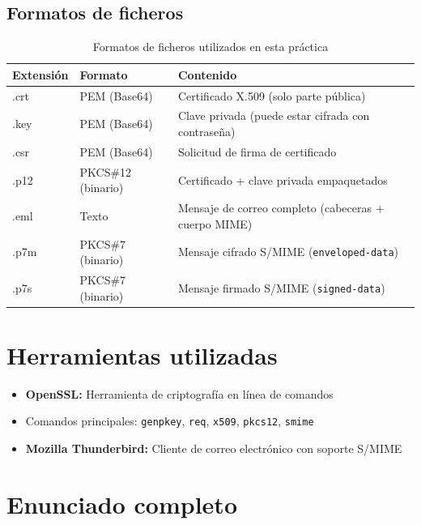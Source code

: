 \subsection{Formatos de ficheros}

\begin{table}[H]
    \centering
    \caption{Formatos de ficheros utilizados en esta práctica}
    \begin{tabularx}{\textwidth}{l|l|X}
        \toprule
        \textbf{Extensión} & \textbf{Formato} & \textbf{Contenido} \\
        \midrule
        .crt & PEM (Base64) & Certificado X.509 (solo parte pública) \\
        .key & PEM (Base64) & Clave privada (puede estar cifrada con contraseña) \\
        .csr & PEM (Base64) & Solicitud de firma de certificado \\
        .p12 & PKCS\#12 (binario) & Certificado + clave privada empaquetados \\
        .eml & Texto & Mensaje de correo completo (cabeceras + cuerpo MIME) \\
        .p7m & PKCS\#7 (binario) & Mensaje cifrado S/MIME (\texttt{enveloped-data}) \\
        .p7s & PKCS\#7 (binario) & Mensaje firmado S/MIME (\texttt{signed-data}) \\
        \bottomrule
    \end{tabularx}
\end{table}

\section{Herramientas utilizadas}

\begin{itemize}[label=\textbullet]
    \item \textbf{OpenSSL:} Herramienta de criptografía en línea de comandos
    \item Comandos principales: \texttt{genpkey}, \texttt{req}, \texttt{x509}, \texttt{pkcs12}, \texttt{smime}
    \item \textbf{Mozilla Thunderbird:} Cliente de correo electrónico con soporte S/MIME
\end{itemize}

\section{Enunciado completo}

